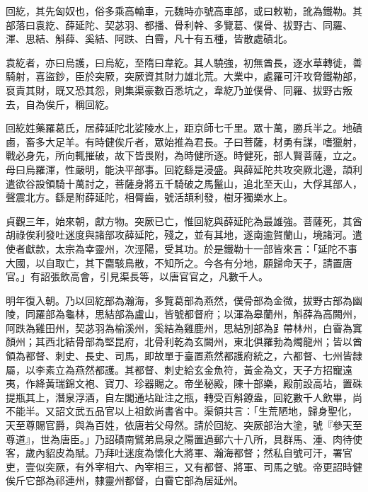 
\begin{pinyinscope}

 回紇，其先匈奴也，俗多乘高輪車，元魏時亦號高車部，或曰敕勒，訛為鐵勒。其部落曰袁紇、薛延陀、契苾羽、都播、骨利幹、多覽葛、僕骨、拔野古、同羅、渾、思結、斛薛、奚結、阿跌、白霫，凡十有五種，皆散處磧北。



 袁紇者，亦曰烏護，曰烏紇，至隋曰韋紇。其人驍強，初無酋長，逐水草轉徙，善騎射，喜盜鈔，臣於突厥，突厥資其財力雄北荒。大業中，處羅可汗攻脅鐵勒部，裒責其財，既又恐其怨，則集渠豪數百悉坑之，韋紇乃並僕骨、同羅、拔野古叛去，自為俟斤，稱回紇。



 回紇姓藥羅葛氏，居薛延陀北娑陵水上，距京師七千里。眾十萬，勝兵半之。地磧鹵，畜多大足羊。有時健俟斤者，眾始推為君長。子曰菩薩，材勇有謀，嗜獵射，戰必身先，所向輒摧破，故下皆畏附，為時健所逐。時健死，部人賢菩薩，立之。母曰烏羅渾，性嚴明，能決平部事。回紇繇是浸盛。與薛延陀共攻突厥北邊，頡利遣欲谷設領騎十萬討之，菩薩身將五千騎破之馬鬣山，追北至天山，大俘其部人，聲震北方。繇是附薛延陀，相脣齒，號活頡利發，樹牙獨樂水上。



 貞觀三年，始來朝，獻方物。突厥已亡，惟回紇與薛延陀為最雄強。菩薩死，其酋胡祿俟利發吐迷度與諸部攻薛延陀，殘之，並有其地，遂南逾賀蘭山，境諸河。遣使者獻款，太宗為幸靈州，次涇陽，受其功。於是鐵勒十一部皆來言：「延陀不事大國，以自取亡，其下麕駭鳥散，不知所之。今各有分地，願歸命天子，請置唐官。」有詔張飲高會，引見渠長等，以唐官官之，凡數千人。



 明年復入朝。乃以回紇部為瀚海，多覽葛部為燕然，僕骨部為金微，拔野古部為幽陵，同羅部為龜林，思結部為盧山，皆號都督府；以渾為皋蘭州，斛薛為高闕州，阿跌為雞田州，契苾羽為榆溪州，奚結為雞鹿州，思結別部為𧾷帶林州，白霫為窴顏州；其西北結骨部為堅昆府，北骨利乾為玄闕州，東北俱羅勃為燭龍州；皆以酋領為都督、刺史、長史、司馬，即故單于臺置燕然都護府統之，六都督、七州皆隸屬，以李素立為燕然都護。其都督、刺史給玄金魚符，黃金為文，天子方招寵遠夷，作絳黃瑞錦文袍、寶刀、珍器賜之。帝坐秘殿，陳十部樂，殿前設高坫，置硃提瓶其上，潛泉浮酒，自左閣通坫趾注之瓶，轉受百斛鐐盎，回紇數千人飲畢，尚不能半。又詔文武五品官以上祖飲尚書省中。渠領共言：「生荒陋地，歸身聖化，天至尊賜官爵，與為百姓，依唐若父母然。請於回紇、突厥部治大塗，號『參天至尊道』，世為唐臣。」乃詔磧南鷿弟鳥泉之陽置過郵六十八所，具群馬、湩、肉待使客，歲內貂皮為賦。乃拜吐迷度為懷化大將軍、瀚海都督；然私自號可汗，署官吏，壹似突厥，有外宰相六、內宰相三，又有都督、將軍、司馬之號。帝更詔時健俟斤它部為祁連州，隸靈州都督，白霫它部為居延州。




\end{pinyinscope}
